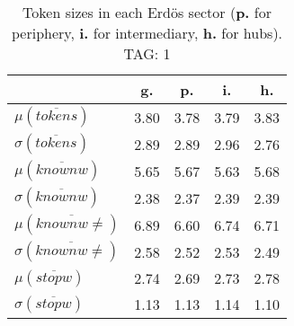 \begin{table}[h!]
\begin{center}
\begin{tabular}{| l || c | c | c | c |}\hline
 & {\bf g.} & {\bf p.} & {\bf i.} & {\bf h.} \\\hline\hline
$\mu(\overline{tokens})$ & 3.80  & 3.78  & 3.79  & 3.83 \\
$\sigma(\overline{tokens})$ & 2.89  & 2.89  & 2.96  & 2.76 \\\hline
$\mu(\overline{knownw})$ & 5.65  & 5.67  & 5.63  & 5.68 \\
$\sigma(\overline{knownw})$ & 2.38  & 2.37  & 2.39  & 2.39 \\\hline
$\mu(\overline{knownw \neq})$ & 6.89  & 6.60  & 6.74  & 6.71 \\
$\sigma(\overline{knownw \neq})$ & 2.58  & 2.52  & 2.53  & 2.49 \\\hline
$\mu(\overline{stopw})$ & 2.74  & 2.69  & 2.73  & 2.78 \\
$\sigma(\overline{stopw})$ & 1.13  & 1.13  & 1.14  & 1.10 \\\hline
\end{tabular}
\caption{Token sizes in each Erd\"os sector ({{\bf p.}} for periphery, {{\bf i.}} for intermediary, {{\bf h.}} for hubs). TAG: 1}
\end{center}
\end{table}